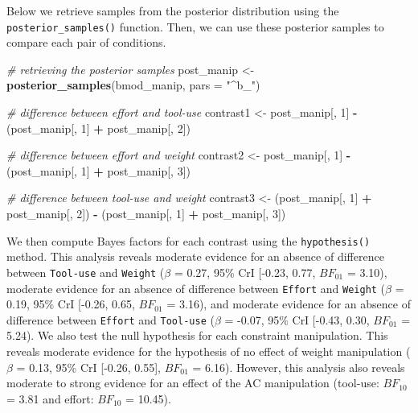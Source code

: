 \documentclass[floatsintext,doc]{apa6}
\newenvironment{Shaded}{\begin{snugshade}}{\end{snugshade}}
\newcommand{\CommentTok}[1]{\textcolor[rgb]{0.56,0.35,0.01}{\textit{#1}}}
\newcommand{\DataTypeTok}[1]{\textcolor[rgb]{0.13,0.29,0.53}{#1}}
\newcommand{\DecValTok}[1]{\textcolor[rgb]{0.00,0.00,0.81}{#1}}
\newcommand{\KeywordTok}[1]{\textcolor[rgb]{0.13,0.29,0.53}{\textbf{#1}}}
\newcommand{\NormalTok}[1]{#1}
\newcommand{\OperatorTok}[1]{\textcolor[rgb]{0.81,0.36,0.00}{\textbf{#1}}}
\newcommand{\StringTok}[1]{\textcolor[rgb]{0.31,0.60,0.02}{#1}}
\begin{document}
Below we retrieve samples from the posterior distribution using the \texttt{posterior\_samples()} function. Then, we can use these posterior samples to compare each pair of conditions.

\begin{Shaded}
\begin{Highlighting}[]
\CommentTok{# retrieving the posterior samples}
\NormalTok{post_manip <-}\StringTok{ }\KeywordTok{posterior_samples}\NormalTok{(bmod_manip, }\DataTypeTok{pars =} \StringTok{"^b_"}\NormalTok{)}

\CommentTok{# difference between effort and tool-use}
\NormalTok{contrast1 <-}\StringTok{ }\NormalTok{post_manip[, }\DecValTok{1}\NormalTok{]  }\OperatorTok{-}\StringTok{ }\NormalTok{(post_manip[, }\DecValTok{1}\NormalTok{] }\OperatorTok{+}\StringTok{ }\NormalTok{post_manip[, }\DecValTok{2}\NormalTok{])}

\CommentTok{# difference between effort and weight}
\NormalTok{contrast2 <-}\StringTok{ }\NormalTok{post_manip[, }\DecValTok{1}\NormalTok{]  }\OperatorTok{-}\StringTok{ }\NormalTok{(post_manip[, }\DecValTok{1}\NormalTok{] }\OperatorTok{+}\StringTok{ }\NormalTok{post_manip[, }\DecValTok{3}\NormalTok{])}

\CommentTok{# difference between tool-use and weight}
\NormalTok{contrast3 <-}\StringTok{ }\NormalTok{(post_manip[, }\DecValTok{1}\NormalTok{] }\OperatorTok{+}\StringTok{ }\NormalTok{post_manip[, }\DecValTok{2}\NormalTok{]) }\OperatorTok{-}\StringTok{ }\NormalTok{(post_manip[, }\DecValTok{1}\NormalTok{] }\OperatorTok{+}\StringTok{ }\NormalTok{post_manip[, }\DecValTok{3}\NormalTok{])}
\end{Highlighting}
\end{Shaded}

We then compute Bayes factors for each contrast using the \texttt{hypothesis()} method. This analysis reveals moderate evidence for an absence of difference between \texttt{Tool-use} and \texttt{Weight} (\(\beta\) = 0.27, 95\% CrI {[}-0.23, 0.77, \(BF_{01}\) = 3.10), moderate evidence for an absence of difference between \texttt{Effort} and \texttt{Weight} (\(\beta\) = 0.19, 95\% CrI {[}-0.26, 0.65, \(BF_{01}\) = 3.16), and moderate evidence for an absence of difference between \texttt{Effort} and \texttt{Tool-use} (\(\beta\) = -0.07, 95\% CrI {[}-0.43, 0.30, \(BF_{01}\) = 5.24). We also test the null hypothesis for each constraint manipulation. This reveals moderate evidence for the hypothesis of no effect of weight manipulation (\(\beta\) = 0.13, 95\% CrI {[}-0.26, 0.55{]}, \(BF_{01}\) = 6.16). However, this analysis also reveals moderate to strong evidence for an effect of the AC manipulation (tool-use: \(BF_{10}\) = 3.81 and effort: \(BF_{10}\) = 10.45).
\end{document}
